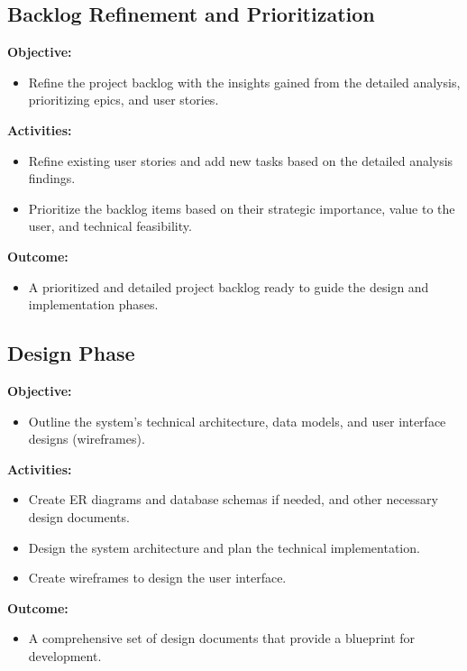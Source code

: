 \documentclass[12pt,a4paper]{article}
\begin{document}
\subsection{Backlog Refinement and Prioritization}

\noindent \textbf{Objective:}
\begin{itemize}
    \item Refine the project backlog with the insights gained from the detailed analysis, prioritizing epics, and user stories.
\end{itemize}

\noindent \textbf{Activities:}
\begin{itemize}
    \item Refine existing user stories and add new tasks based on the detailed analysis findings.
    \item Prioritize the backlog items based on their strategic importance, value to the user, and technical feasibility.
\end{itemize}

\noindent \textbf{Outcome:}
\begin{itemize}
    \item A prioritized and detailed project backlog ready to guide the design and implementation phases.
\end{itemize}

\subsection{Design Phase}

\noindent \textbf{Objective:}
\begin{itemize}
    \item Outline the system's technical architecture, data models, and user interface designs (wireframes).
\end{itemize}

\noindent \textbf{Activities:}
\begin{itemize}
    \item Create ER diagrams and database schemas if needed, and other necessary design documents.
    \item Design the system architecture and plan the technical implementation.
    \item Create wireframes to design the user interface.
\end{itemize}

\noindent \textbf{Outcome:}
\begin{itemize}
    \item A comprehensive set of design documents that provide a blueprint for development.
\end{itemize}
\end{document}
